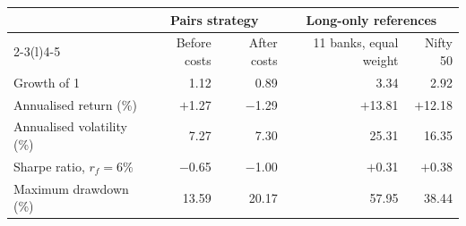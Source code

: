 \begin{tabular}{@{}lrrrr@{}}
\toprule
 & \multicolumn{2}{c}{Pairs strategy} & \multicolumn{2}{c}{Long-only references} \\
\cmidrule(lr){2-3}\cmidrule(l){4-5}
 & Before costs & After costs & 11 banks, equal weight & Nifty 50 \\
\midrule
Growth of 1 & 1.12 & 0.89 & 3.34 & 2.92 \\
Annualised return (\%) & $+$1.27 & $-$1.29 & $+$13.81 & $+$12.18 \\
Annualised volatility (\%) & 7.27 & 7.30 & 25.31 & 16.35 \\
Sharpe ratio, $r_f = 6\%$ & $-$0.65 & $-$1.00 & $+$0.31 & $+$0.38 \\
Maximum drawdown (\%) & 13.59 & 20.17 & 57.95 & 38.44 \\
\bottomrule
\end{tabular}
